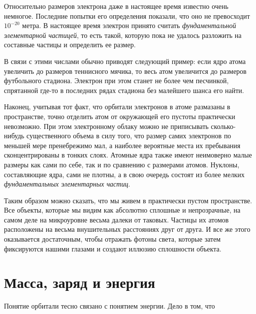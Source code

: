 Относительно размеров электрона даже в настоящее время известно очень немногое.
Последние попытки его определения показали, что оно не превосходит $10^{-20}$ метра.
В настоящее время электрон принято считать \textit{фундаментальной элементарной частицей}, то есть такой, которую пока не удалось разложить на составные частицы и определить ее размер.

В связи с этими числами обычно приводят следующий пример: если ядро атома увеличить до размеров теннисного мячика, то весь атом увеличится до размеров футбольного стадиона.
Электрон при этом станет не более чем песчинкой, спрятанной где-то в последних рядах стадиона без малейшего шанса его найти.

Наконец, учитывая тот факт, что орбитали электронов в атоме размазаны в пространстве, точно отделить атом от окружающей его пустоты практически невозможно.
При этом электронному облаку можно не приписывать сколько-нибудь существенного объема в силу того, что размер самих электронов по меньшей мере пренебрежимо мал, а наиболее вероятные места их пребывания сконцентрированы в тонких слоях.
Атомные ядра также имеют неимоверно малые размеры как сами по себе, так и по сравнению с размерами атомов.
Нуклоны, составляющие ядра, сами не плотны, а в свою очередь состоят из более мелких \textit{фундаментальных элементарных частиц}.

Таким образом можно сказать, что мы живем в практически пустом пространстве.
Все объекты, которые мы видим как абсолютно сплошные и непрозрачные, на самом деле на микроуровне весьма далеки от таковых.
Частицы их атомов расположены на весьма внушительных расстояниях друг от друга.
И все же этого оказывается достаточным, чтобы отражать фотоны света, которые затем фиксируются нашими глазами и создают иллюзию сплошности объекта. 


\section*{Масса, заряд и энергия}

Понятие орбитали тесно связано с понятием энергии.
Дело в том, что 

